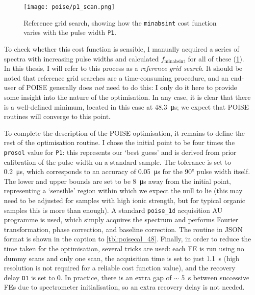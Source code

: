 \begin{figure}[htb]
    \centering
    \texttt{[image: poise/p1\_scan.png]}%
    \caption[Reference grid search for pulse width optimisation]{
        Reference grid search, showing how the \texttt{minabsint} cost function varies with the pulse width \texttt{P1}.
    }
    \label{fig:p1_scan}
\end{figure}

To check whether this cost function is sensible, I manually acquired a series of spectra with increasing pulse widths and calculated $f_\text{minabsint}$ for all of these (\cref{fig:p1_scan}).
In this thesis, I will refer to this process as a \textit{reference grid search}.
It should be noted that reference grid searches are a time-consuming procedure, and an end-user of POISE generally does \textit{not} need to do this: I only do it here to provide some insight into the nature of the optimisation.
In any case, it is clear that there is a well-defined minimum, located in this case at \SI{48.3}{\us}; we expect that POISE routines will converge to this point.

To complete the description of the POISE optimisation, it remains to define the rest of the optimisation routine.
I chose the initial point to be four times the \texttt{prosol} value for \texttt{P1}: this represents our `best guess' and is derived from prior calibration of the pulse width on a standard sample.
The tolerance is set to \SI{0.2}{\us}, which corresponds to an accuracy of \SI{0.05}{\us} for the \ang{90} pulse width itself.
The lower and upper bounds are set to be \SI{8}{\us} away from the initial point, representing a `sensible' region within which we expect the null to lie (this may need to be adjusted for samples with high ionic strength, but for typical organic samples this is more than enough).
A standard \texttt{poise\_1d} acquisition AU programme is used, which simply acquires the spectrum and performs Fourier transformation, phase correction, and baseline correction.
The routine in JSON format is shown in the caption to \cref{tbl:poisecal_48}.
Finally, in order to reduce the time taken for the optimisation, several tricks are used: each FE is run using no dummy scans and only one scan, the acquisition time is set to just \SI{1.1}{\s} (high resolution is not required for a reliable cost function value), and the recovery delay \texttt{D1} is set to 0.
In practice, there is an extra gap of $\sim$ \SI{5}{\s} between successive FEs due to spectrometer initialisation, so an extra recovery delay is not needed.


